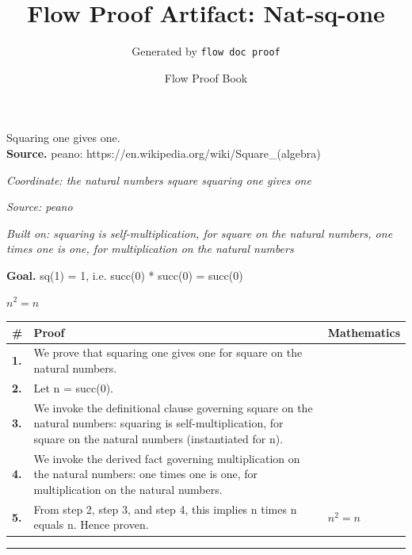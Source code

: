 \documentclass[11pt]{article}
\title{Flow Proof Artifact: Nat-sq-one}
\author{Generated by \texttt{flow doc proof}}
\date{Flow Proof Book}
\theoremstyle{definition}
\begin{document}
\maketitle
Squaring one gives one.\\[0.5em]
\textbf{Source.} peano: https://en.wikipedia.org/wiki/Square\_(algebra)\\[0.5em]
\bigskip
{}\par
\smallskip\noindent\textit{Coordinate: the natural numbers \cdot square \cdot squaring one gives one}\par
\smallskip\noindent\textit{Source: peano}\par
\smallskip\noindent\textit{Built on: squaring is self-multiplication, for square on the natural numbers, one times one is one, for multiplication on the natural numbers}\par
\medskip
\noindent\textbf{Goal.} sq(1) = 1, i.e. succ(0) * succ(0) = succ(0)\par
\noindent$\displaystyle n^{2} = n$\par
\medskip
\noindent
\begin{tabular}{@{} >{\raggedright\arraybackslash}p{} >{\raggedright\arraybackslash}p{} >{\raggedleft\arraybackslash}p{} @{}}
\textbf{\#} & \textbf{Proof} & \textbf{Mathematics} \\
\midrule
\textbf{1.} & We prove that squaring one gives one for square on the natural numbers. & \\[0.45em]
\textbf{2.} & Let n = succ(0). & \\[0.45em]
\textbf{3.} & We invoke the definitional clause governing square on the natural numbers: squaring is self-multiplication, for square on the natural numbers (instantiated for n). & \\[0.45em]
\textbf{4.} & We invoke the derived fact governing multiplication on the natural numbers: one times one is one, for multiplication on the natural numbers. & \\[0.45em]
\textbf{5.} & From step 2, step 3, and step 4, this implies n times n equals n. Hence proven. & $\displaystyle n^{2} = n$ \\[0.45em]
\bottomrule
\end{tabular}
\label{thm:Nat-square-squaring_one_gives_one}
\par\medskip\hrule
\end{document}

